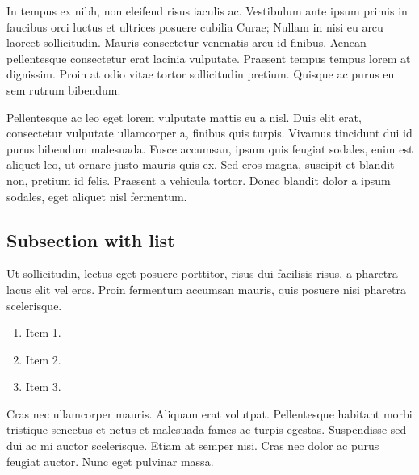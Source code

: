 In tempus ex nibh, non eleifend risus iaculis ac. Vestibulum ante ipsum primis in faucibus orci luctus et ultrices posuere cubilia Curae; Nullam in nisi eu arcu laoreet sollicitudin. Mauris consectetur venenatis arcu id finibus. Aenean pellentesque consectetur erat lacinia vulputate. Praesent tempus tempus lorem at dignissim. Proin at odio vitae tortor sollicitudin pretium. Quisque ac purus eu sem rutrum bibendum.

%

Pellentesque ac leo eget lorem vulputate mattis eu a nisl. Duis elit erat, consectetur vulputate ullamcorper a, finibus quis turpis. Vivamus tincidunt dui id purus bibendum malesuada. Fusce accumsan, ipsum quis feugiat sodales, enim est aliquet leo, ut ornare justo mauris quis ex. Sed eros magna, suscipit et blandit non, pretium id felis. Praesent a vehicula tortor. Donec blandit dolor a ipsum sodales, eget aliquet nisl fermentum.

\subsection{Subsection with list}

Ut sollicitudin, lectus eget posuere porttitor, risus dui facilisis risus, a pharetra lacus elit vel eros. Proin fermentum accumsan mauris, quis posuere nisi pharetra scelerisque. 
\begin{enumerate}
  \item Item 1.
  \item Item 2.
  \item Item 3.
\end{enumerate}

Cras nec ullamcorper mauris. Aliquam erat volutpat. Pellentesque habitant morbi tristique senectus et netus et malesuada fames ac turpis egestas. Suspendisse sed dui ac mi auctor scelerisque. Etiam at semper nisi. Cras nec dolor ac purus feugiat auctor. Nunc eget pulvinar massa.

%

